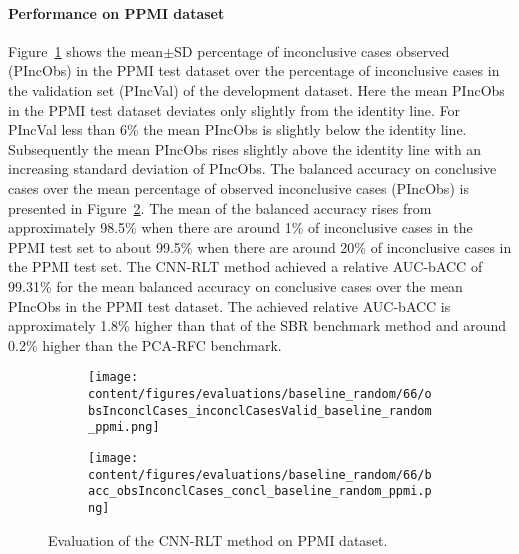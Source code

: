 


\paragraph{Performance on PPMI dataset}

Figure~\ref{fig:obsInconclCases_inconclCasesValid_baseline_random_ppmi} shows the
mean$\pm$SD percentage of inconclusive cases observed (PIncObs) in the PPMI test dataset 
over the percentage of inconclusive cases in the validation set (PIncVal) of the development dataset.
Here the mean PIncObs in the PPMI test dataset deviates only slightly from the identity line.
For PIncVal less than 6\% the mean PIncObs is slightly below the identity line.
Subsequently the mean PIncObs rises slightly above the identity line with an increasing standard deviation of PIncObs.
The balanced accuracy on conclusive cases over the mean percentage of observed inconclusive cases (PIncObs) is presented 
in Figure~\ref{fig:bacc_obsInconclCases_concl_baseline_random_ppmi}.
The mean of the balanced accuracy rises from approximately 98.5\% 
when there are around 1\% of inconclusive cases in the PPMI test set to about 99.5\% 
when there are around 20\% of inconclusive cases in the PPMI test set.
The CNN-RLT method achieved a relative AUC-bACC of 99.31\% for the mean balanced accuracy on conclusive cases 
over the mean PIncObs in the PPMI test dataset.
The achieved relative AUC-bACC is approximately 1.8\% higher than that of the SBR benchmark method 
and around 0.2\% higher than the PCA-RFC benchmark.


\begin{figure}[ht]
  \begin{subfigure}{0.49\textwidth}
    \centering
    \texttt{[image: content/figures/evaluations/baseline\_random/66/obsInconclCases\_inconclCasesValid\_baseline\_random\_ppmi.png]}
    \label{fig:obsInconclCases_inconclCasesValid_baseline_random_ppmi}
  \end{subfigure}
  \hfill
  \begin{subfigure}{0.49\textwidth}
    \centering
    \texttt{[image: content/figures/evaluations/baseline\_random/66/bacc\_obsInconclCases\_concl\_baseline\_random\_ppmi.png]}
    \label{fig:bacc_obsInconclCases_concl_baseline_random_ppmi}
  \end{subfigure}
  \caption{Evaluation of the CNN-RLT method on PPMI dataset.}
  \label{fig:perf_eval_rlt_ppmi}
\end{figure}



